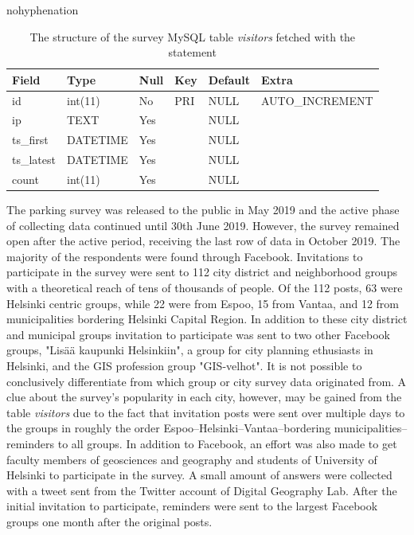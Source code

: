 \begin{hyphenrules}{nohyphenation}
    \begin{table}[H]
        \centering
        \setlength\tabcolsep{1.2ex}
        \caption[Structure of MySQL table visitors]{The structure of the survey MySQL table \textit{visitors} fetched with the statement } 
        \label{tab:mysql_visitors_str}
        \begin{tabular}{ @{} >{\raggedright\arraybackslash}p{2cm} >{\raggedright\arraybackslash}p{2cm} >{\raggedright\arraybackslash}p{1cm} >{\raggedright\arraybackslash}p{1cm} >{\raggedright\arraybackslash}p{1.5cm} >{\raggedleft\arraybackslash}p{4cm} @{} }
            \toprule
            Field & Type & Null & Key & Default & Extra \\
            \midrule
            id & int(11) & No & PRI & NULL & AUTO\_INCREMENT \\
            ip & TEXT & Yes & & NULL & \\
            ts\_first & DATETIME & Yes & & NULL & \\
            ts\_latest & DATETIME & Yes & & NULL & \\
            count & int(11) & Yes & & NULL & \\        
            \bottomrule
        \end{tabular}
    \end{table} 
\end{hyphenrules}

The parking survey was released to the public in May 2019 and the active phase of collecting data continued until 30th June 2019. However, the survey remained open after the active period, receiving the last row of data in October 2019. The majority of the respondents were found through Facebook. Invitations to participate in the survey were sent to 112 city district and neighborhood groups with a theoretical reach of tens of thousands of people. Of the 112 posts, 63 were Helsinki centric groups, while 22 were from Espoo, 15 from Vantaa, and 12 from municipalities bordering Helsinki Capital Region. In addition to these city district and municipal groups invitation to participate was sent to two other Facebook groups, "Lisää kaupunki Helsinkiin", a group for city planning ethusiasts in Helsinki, and the GIS profession group "GIS-velhot". It is not possible to conclusively differentiate from which group or city survey data originated from. A clue about the survey's popularity in each city, however, may be gained from the table \textit{visitors} due to the fact that invitation posts were sent over multiple days to the groups in roughly the order Espoo--Helsinki--Vantaa--bordering municipalities--reminders to all groups. In addition to Facebook, an effort was also made to get faculty members of geosciences and geography and students of University of Helsinki to participate in the survey. A small amount of answers were collected with a tweet sent from the Twitter account of Digital Geography Lab. After the initial invitation to participate, reminders were sent to the largest Facebook groups one month after the original posts.

